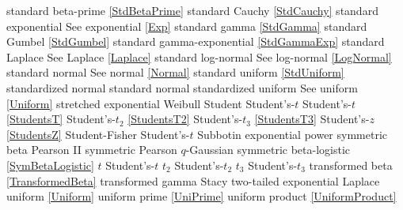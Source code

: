 standard beta-prime				\dotfill	\eqref{StdBetaPrime}				\ncite	%
standard Cauchy				\dotfill	\eqref{StdCauchy} 					\ncite	%
standard exponential				\dotfill	See exponential \eqref{Exp} 			\ncite	%
standard gamma 				\dotfill	\eqref{StdGamma} 					\ncite	%
standard Gumbel 				\dotfill	\eqref{StdGumbel} 					\ncite	%
standard gamma-exponential		\dotfill	\eqref{StdGammaExp} 				\ncite	%
standard Laplace				\dotfill	See Laplace \eqref{Laplace}			\ncite	%
standard log-normal				\dotfill	See log-normal \eqref{LogNormal} 		\ncite	%
standard normal 				\dotfill	See normal \eqref{Normal} 			\ncite	%
standard uniform				\dotfill	\eqref{StdUniform}					\ncite	%
standardized normal 				\dotfill	standard normal					\ncite	%
standardized uniform 			\dotfill	See uniform \eqref{Uniform}			\ncite	%
stretched exponential 			\dotfill	Weibull 								
Student						\dotfill 	Student's-$t$						\ncite	%
Student's-$t$					\dotfill	\eqref{StudentsT}  					\ncite	%
Student's-$t_2$					\dotfill	\eqref{StudentsT2}  					\ncite	%
Student's-$t_3$					\dotfill	\eqref{StudentsT3}  					\ncite	
Student's-$z$					\dotfill	\eqref{StudentsZ}					\ncite	%
Student-Fisher					\dotfill	Student's-$t$							%
Subbotin						\dotfill	exponential power					\ncite
symmetric beta					\dotfill	Pearson II							\ncite	%
symmetric Pearson				\dotfill	$q$-Gaussian						\mcite{\self}		%
symmetric beta-logistic			\dotfill	\eqref{SymBetaLogistic}				\mcite{\self}
%
$t$							\dotfill	Student's-$t$ 						\ncite	%
$t_2$						\dotfill	Student's-$t_2$ 					\ncite	%
$t_3$						\dotfill	Student's-$t_3$ 					\ncite
transformed beta				\dotfill	\eqref{TransformedBeta} 				\ncite	%
transformed gamma				\dotfill	Stacy 							\ncite %
two-tailed exponential			\dotfill	Laplace							\ncite %
%
uniform  						\dotfill	\eqref{Uniform}						\ncite 	%
uniform prime					\dotfill	\eqref{UniPrime}					\ncite	%
uniform product 				\dotfill	\eqref{UniformProduct}				\ncite 	%
